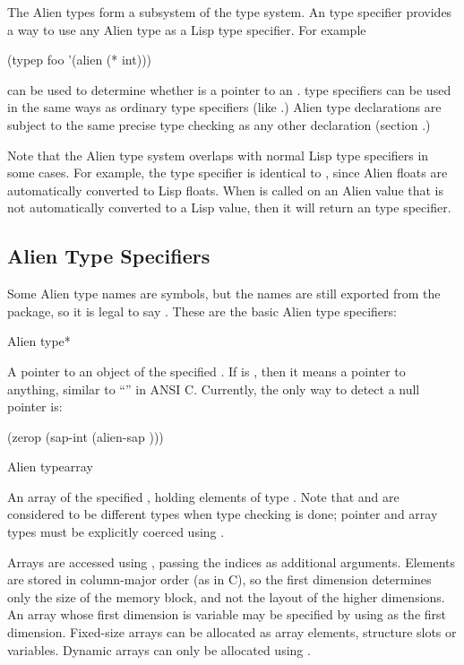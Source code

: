 The Alien types form a subsystem of the \cmucl{} type system.  An
 type specifier provides a way to use any Alien type as a
Lisp type specifier.  For example

\begin{lisp}
(typep foo '(alien (* int)))
\end{lisp}

can be used to determine whether  is a pointer to an
.   type specifiers can be used in the same ways
as ordinary type specifiers (like .)  Alien type
declarations are subject to the same precise type checking as any
other declaration (section .)

Note that the Alien type system overlaps with normal Lisp type
specifiers in some cases.  For example, the type specifier
 is identical to , since
Alien floats are automatically converted to Lisp floats.  When
 is called on an Alien value that is not automatically
converted to a Lisp value, then it will return an  type
specifier.


\subsection{Alien Type Specifiers}

Some Alien type names are \clisp symbols, but the names are
still exported from the  package, so it is legal to say
.  These are the basic Alien type specifiers: 

\begin{deftp}{Alien type}{*}{%
    }
  
  A pointer to an object of the specified .  If 
  is \true, then it means a pointer to anything, similar to
  ``'' in ANSI C.  Currently, the only way to detect a
  null pointer is:
\begin{lisp}
  (zerop (sap-int (alien-sap )))
\end{lisp}
\end{deftp}

\begin{deftp}{Alien type}{array}{ } 

  An array of the specified , holding elements of type
  .  Note that  and  are
  considered to be different types when type checking is done; pointer
  and array types must be explicitly coerced using .
  
  Arrays are accessed using , passing the indices as
  additional arguments.  Elements are stored in column-major order (as
  in C), so the first dimension determines only the size of the memory
  block, and not the layout of the higher dimensions.  An array whose
  first dimension is variable may be specified by using \nil{} as the
  first dimension.  Fixed-size arrays can be allocated as array
  elements, structure slots or  variables.  Dynamic
  arrays can only be allocated using .
\end{deftp}


